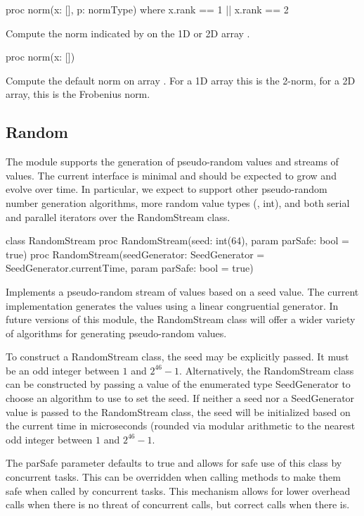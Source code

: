 \begin{protohead}
proc norm(x: [], p: normType) where x.rank == 1 || x.rank == 2
\end{protohead}
\begin{protobody}
Compute the norm indicated by  on the 1D or 2D array .
\end{protobody}

\begin{protohead}
proc norm(x: [])
\end{protohead}
\begin{protobody}
Compute the default norm on array .  For a 1D array this is
the 2-norm, for a 2D array, this is the Frobenius norm.
\end{protobody}


\subsection{Random}
\label{Random}

The module  supports the generation of pseudo-random
values and streams of values.  The current interface is minimal and
should be expected to grow and evolve over time.  In particular, we
expect to support other pseudo-random number generation algorithms,
more random value types (\eg, int), and both serial and parallel
iterators over the RandomStream class.

\begin{protohead}
class RandomStream
proc RandomStream(seed: int(64), param parSafe: bool = true)
proc RandomStream(seedGenerator: SeedGenerator = SeedGenerator.currentTime,
                 param parSafe: bool = true)
\end{protohead}
\begin{protobody}
Implements a pseudo-random stream of values based on a seed value.
The current implementation generates the values using a linear
congruential generator.  In future versions of this module, the
RandomStream class will offer a wider variety of algorithms for
generating pseudo-random values.

To construct a RandomStream class, the seed may be explicitly passed.
It must be an odd integer between $1$ and $2^{46}-1$.  Alternatively,
the RandomStream class can be constructed by passing a value of the
enumerated type SeedGenerator to choose an algorithm to use to set the
seed.  If neither a seed nor a SeedGenerator value is passed to the
RandomStream class, the seed will be initialized based on the current
time in microseconds (rounded via modular arithmetic to the nearest
odd integer between $1$ and $2^{46}-1$.

The parSafe parameter defaults to true and allows for safe use of this
class by concurrent tasks.  This can be overridden when calling
methods to make them safe when called by concurrent tasks.  This
mechanism allows for lower overhead calls when there is no threat of
concurrent calls, but correct calls when there is.
\end{protobody}

